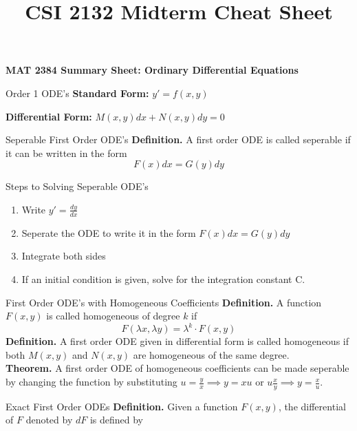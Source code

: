 \documentclass{article}
\title{CSI 2132 Midterm Cheat Sheet}
\begin{document}
\begin{center}{\large{\textbf{MAT 2384 Summary Sheet: Ordinary Differential Equations}}}\\
\end{center}




\begin{multicols*}{3}
\begin{blackbox}{Order 1 ODE's}
    \textbf{Standard Form:} $y' = f(x,y)$

    \textbf{Differential Form:} $M(x,y)dx + N(x,y)dy = 0$
    \begin{bluebox}{Seperable First Order ODE's}
        \textbf{Definition.} A first order ODE is called seperable if it can be written in the form \\[-2ex]
        \[F(x)dx = G(y)dy\]
        \begin{redbox}{Steps to Solving Seperable ODE's}
            \begin{enumerate}[align=left]
                \item Write $y' = \frac{dy}{dx}$
                \item Seperate the ODE to write it in the form $F(x)dx = G(y)dy$
                \item Integrate both sides
                \item If an initial condition is given, solve for the integration constant C. 
            \end{enumerate}
        \end{redbox}
    \end{bluebox}
    \begin{brownbox}{First Order ODE's with Homogeneous Coefficients}
        \textbf{Definition.} A function $F(x,y)$ is called homogeneous of degree $k$ if \\[-2ex]
        \[F(\lambda x, \lambda y) = \lambda^k \cdot F(x,y)\]
        \textbf{Definition.} A first order ODE given in differential form is called homogeneous if both $M(x,y)$ and $N(x,y)$ are homogeneous of the same degree.\\[1ex]
        \textbf{Theorem.} A first order ODE of homogeneous coefficients can be made seperable by changing the function by substituting $u = \frac{y}{x} \implies y = xu$ or $u \frac{x}{y} \implies y = \frac{x}{u}$. 
    \end{brownbox}
    \begin{bluebox}{Exact First Order ODEs}
        \textbf{Definition.} Given a function $F(x,y)$, the differential of $F$ denoted by $dF$ is defined by

\end{bluebox}
\end{blackbox}
\end{multicols*}
\end{document}
